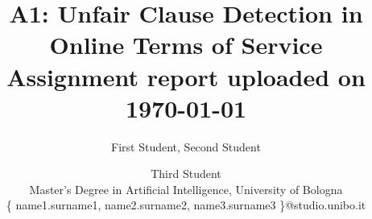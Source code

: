 \documentclass[11pt]{article}
\begin{document}
%
\title{A1: Unfair Clause Detection in Online Terms of Service \\
{\large \rm Assignment report uploaded on \today}
}
\author{First Student,
Second Student \and
Third Student
\\
Master's Degree in Artificial Intelligence, University of Bologna\\
\{ name1.surname1, name2.surname2, name3.surname3 \}@studio.unibo.it
}
\maketitle



\myabstract{


}
    



\introduction



\systemdescription



\experiments



\discussion



\conclusion



\aireport






\externallinks




\myappendix

\end{document}
